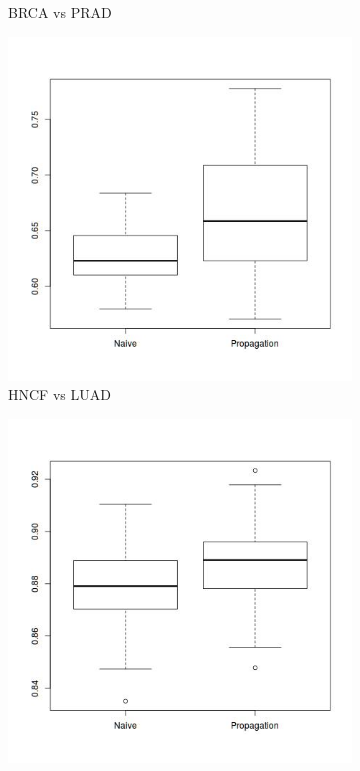 \documentclass[a4paper]{article}
\begin{document}
\begin{figure} [h]
\begin{subfigure}[b]{0.45\textwidth}
	\caption{BRCA vs PRAD}
\end{subfigure}
\begin{subfigure}[b]{0.45\textwidth}
	\includegraphics[width=\textwidth]{figures/HNCF_LUAD.jpg}
	\caption{HNCF vs LUAD}
\end{subfigure}
\begin{subfigure}[b]{0.45\textwidth}
	\includegraphics[width=\textwidth]{figures/HNCF_PRAD.jpg}

\end{subfigure}
\end{figure}
\end{document}
